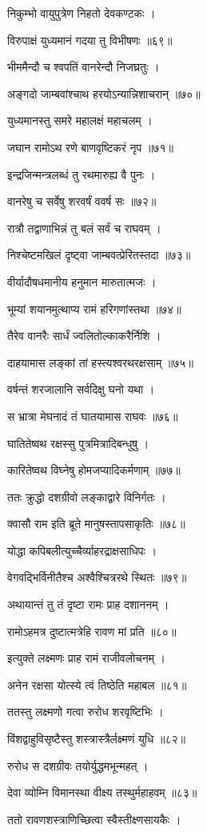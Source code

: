निकुम्भो वायुपुत्रेण निहतो देवकण्टकः ।

विरुपाक्षं युध्यमानं गदया तु विभीषणः ॥६९॥

भीममैन्दौ च श्वपतिं वानरेन्दौ निजघ्रतुः ।

अङ्गदो जाम्बवांश्चाथ हरयोऽन्यान्निशाचरान् ॥७०॥

युध्यमानस्तु समरे महालक्षं महाचलम् ।

जघान रामोऽथ रणे बाणवृष्टिकरं नृप ॥७१॥

इन्द्रजिन्मन्त्रलब्धं तु रथमारुह्य वै पुनः ।

वानरेषु च सर्वेषु शरवर्षं ववर्ष सः ॥७२॥

रात्रौ तद्वाणाभिन्नं तु बलं सर्वं च राघवम् ।

निश्चेष्टमखिलं दृष्ट्वा जाम्बवत्प्रेरितस्तदा ॥७३॥

वीर्यादौषधमानीय हनुमान मारुतात्मजः ।

भूम्यां शयानमुत्थाप्य रामं हरिगणांस्तथा ॥७४॥

तैरेव वानरैः सार्धं ज्वलितोल्काकरैर्निशि ।

दाहयामास लङ्कां तां हस्त्यश्वरथरक्षसाम् ॥७५॥

वर्षन्तं शरजालानि सर्वदिक्षु घनो यथा ।

स भ्रात्रा मेघनादं तं घातयामास राघवः ॥७६॥

घातितेष्वथ रक्षस्सु पुत्रमित्रादिबन्धुषु ।

कारितेष्वथ विघ्नेषु होमजप्यादिकर्मणाम् ॥७७॥

ततः क्रुद्धो दशग्रीवो लङ्काद्वारे विनिर्गतः ।

क्वासौ राम इति ब्रूते मानुषस्तापसाकृतिः ॥७८॥

योद्धा कपिबलीत्युच्चैर्व्याहरद्राक्षसाधिपः ।

वेगवद्भिर्विनीतैश्च अश्वैश्चित्ररथे स्थितः ॥७९॥

अथायान्तं तु तं दृष्टा रामः प्राह दशाननम् ।

रामोऽहमत्र दुष्टात्मत्रेहि रावण मां प्रति ॥८०॥

इत्युक्ते लक्ष्मणः प्राह रामं राजीवलोचनम् ।

अनेन रक्षसा योत्स्ये त्वं तिष्ठेति महाबल ॥८१॥

ततस्तु लक्ष्मणो गत्वा रुरोध शरवृष्टिभिः ।

विंशद्वाहुविसृष्टैस्तु शस्त्रास्त्रैर्लक्ष्मणं युधि ॥८२॥

रुरोध स दशग्रीवः तयोर्युद्धमभून्महत् ।

देवा व्योम्नि विमानस्था वीक्ष्य तस्थुर्महाहवम् ॥८३॥

ततो रावणशस्त्राणिच्छित्वा स्वैस्तीक्ष्णसायकैः ।

